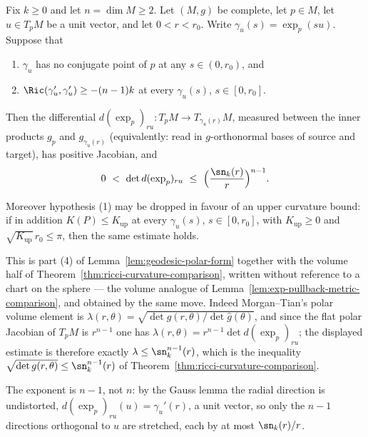 \begin{lemma}
\label{lem:exp-pullback-volume-comparison}
\leanok
Fix $k\ge0$ and let $n=\dim M\ge2$. Let $(M,g)$ be complete, let $p\in M$, let
$u\in T_pM$ be a unit vector, and let $0<r<r_0$. Write
$\gamma_u(s)=\exp_p(su)$. Suppose that
\begin{enumerate}
\item $\gamma_u$ has no conjugate point of $p$ at any $s\in(0,r_0)$, and
\item $\Ric(\gamma_u',\gamma_u')\ge-(n-1)k$ at every $\gamma_u(s)$,
$s\in[0,r_0]$.
\end{enumerate}
Then the differential $d(\exp_p)_{ru}\colon T_pM\to T_{\gamma_u(r)}M$, measured
between the inner products $g_p$ and $g_{\gamma_u(r)}$ (equivalently: read in
$g$-orthonormal bases of source and target), has positive Jacobian, and
$$0\ <\ \det d(\exp_p)_{ru}\ \le\ \Bigl(\frac{\sn_{k}(r)}{r}\Bigr)^{n-1}.$$

Moreover hypothesis (1) may be dropped in favour of an upper curvature bound: if
in addition $K(P)\le K_{\mathrm{up}}$ at every $\gamma_u(s)$, $s\in[0,r_0]$, with
$K_{\mathrm{up}}\ge0$ and $\sqrt{K_{\mathrm{up}}}\,r_0\le\pi$, then the same
estimate holds.
\end{lemma}

This is part (4) of Lemma~\ref{lem:geodesic-polar-form} together with the volume
half of Theorem~\ref{thm:ricci-curvature-comparison}, written without reference
to a chart on the sphere --- the volume analogue of
Lemma~\ref{lem:exp-pullback-metric-comparison}, and obtained by the same move.
Indeed Morgan--Tian's polar volume element is
$\lambda(r,\theta)=\sqrt{\det g(r,\theta)/\det\hat g(\theta)}$, and since the
flat polar Jacobian of $T_pM$ is $r^{n-1}$ one has
$\lambda(r,\theta)=r^{n-1}\det d(\exp_p)_{ru}$; the displayed estimate is
therefore exactly $\lambda\le\sn_k^{n-1}(r)$, which is the inequality
$\sqrt{\det g(r,\theta)}\le\sn_k^{n-1}(r)$ of
Theorem~\ref{thm:ricci-curvature-comparison}.

The exponent is $n-1$, not $n$: by the Gauss lemma the radial direction is
undistorted, $d(\exp_p)_{ru}(u)=\gamma_u'(r)$, a unit vector, so only the $n-1$
directions orthogonal to $u$ are stretched, each by at most $\sn_k(r)/r$.

